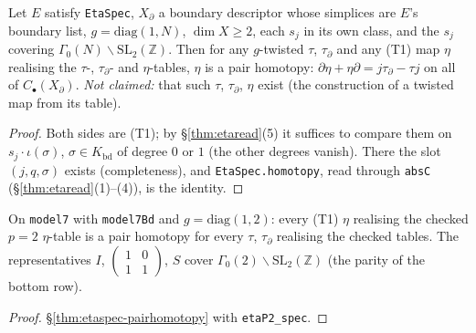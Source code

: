\begin{theorem}\label{thm:etaspec-pairhomotopy}
  \leanok
  Let $E$ satisfy \texttt{EtaSpec}, $X_\partial$ a boundary descriptor whose simplices are $E$'s boundary list, $g=\mathrm{diag}(1,N)$,
  $\dim X\ge2$, each $s_j$ in its own class, and the $s_j$ covering $\Gamma_0(N)\backslash\mathrm{SL}_2(\mathbb Z)$. Then for any
  $g$-twisted $\tau$, $\tau_\partial$ and any (T1) map $\eta$ realising the $\tau$-, $\tau_\partial$- and $\eta$-tables,
  $\eta$ is a pair homotopy: $\partial\eta+\eta\partial=j\tau_\partial-\tau j$ on all of $C_\bullet(X_\partial)$.
  \emph{Not claimed:} that such $\tau$, $\tau_\partial$, $\eta$ exist (the construction of a twisted map from its table).
\end{theorem}
\begin{proof}
  \leanok
  Both sides are (T1); by \S\ref{thm:etaread}(5) it suffices to compare them on $s_j\cdot\iota(\sigma)$, $\sigma\in K_{\mathrm{bd}}$ of
  degree $0$ or $1$ (the other degrees vanish). There the slot $(j,q,\sigma)$ exists (completeness), and \texttt{EtaSpec.homotopy}, read
  through \texttt{absC} (\S\ref{thm:etaread}(1)--(4)), is the identity.
\end{proof}

\begin{corollary}[The real $p=2$ $\eta$-table is a pair homotopy]\label{cor:etap2-pairhomotopy}
  \leanok
  On \texttt{model7} with \texttt{model7Bd} and $g=\mathrm{diag}(1,2)$: every (T1) $\eta$ realising the checked $p=2$ $\eta$-table is a
  pair homotopy for every $\tau$, $\tau_\partial$ realising the checked tables. The representatives $I$, $\left(\begin{smallmatrix}1&0\\1&1\end{smallmatrix}\right)$,
  $S$ cover $\Gamma_0(2)\backslash\mathrm{SL}_2(\mathbb Z)$ (the parity of the bottom row).
\end{corollary}
\begin{proof}
  \leanok
  \S\ref{thm:etaspec-pairhomotopy} with \texttt{etaP2\_spec}.
\end{proof}
